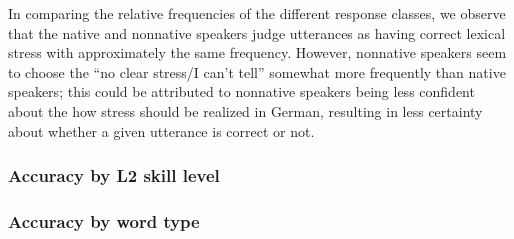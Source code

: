 		In comparing the relative frequencies of the different response classes, we observe that the native and nonnative speakers judge utterances as having correct lexical stress with approximately the same frequency. However, nonnative speakers seem to choose the ``no clear stress/I can't tell'' somewhat more frequently than native speakers; this could be attributed to nonnative speakers being less confident about the how stress should be realized in German, resulting in less certainty about whether a given utterance is correct or not. 
		
		\subsubsection{Accuracy by L2 skill level}
		
		
		
		\subsubsection{Accuracy by word type}


